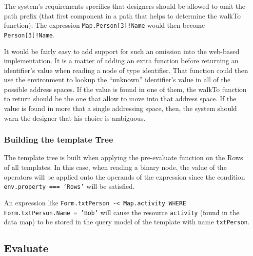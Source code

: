 The system's requirements specifies that designers should be allowed to omit the path prefix (that first component in a path that helps to determine the walkTo function). The expression \texttt{Map.Person[3]!Name} would then become \texttt{Person[3]!Name}.

It would be fairly easy to add support for such an omission into the web-based implementation. It is a matter of adding an extra function before returning an identifier's value when reading a node of type identifier. That function could then use the environment to lookup the ``unknown'' identifier's value in all of the possible address spaces. If the value is found in one of them, the walkTo function to return should be the one that allow to move into that address space. If the value is found in more that a single addressing space, then, the system should warn the designer that his choice is ambiguous.

\subsubsection{Building the template Tree}

The template tree is built when applying the pre-evaluate function on the Rows of all templates. In this case, when reading a binary node, the value of the operators will be applied onto the operands of the expression since the condition \texttt{env.property === 'Rows'} will be satisfied.

An expression like \texttt{Form.txtPerson -< Map.activity WHERE Form.txtPerson.Name = 'Bob'} will cause the resource \texttt{activity} (found in the data map) to be stored in the query model of the template with name \texttt{txtPerson}.


\subsection{Evaluate}
\label{sec:Eval}
